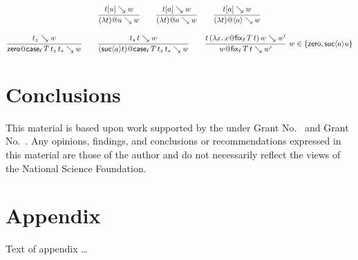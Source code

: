 \documentclass[acmlarge,review,anonymous]{acmart}\settopmatter{printfolios=true}
\begin{document}

\begin{gather*}
  \ru{t[u] \evalsto w
    }{(\lambda t) @ u \evalsto w}
\qquad
  \ru{t[a] \evalsto w
    }{(\lambda t) @ a \evalsto w}
\qquad
  \ru{t[a] \evalsto w
    }{(\lambda t) @ \ann a \evalsto w}
\\[2ex]
  \ru{t_z \evalsto w
    }{\tzero @ \casett \evalsto w}
\qquad
  \ru{t_s\, t \evalsto w
    }{(\suc a t) @ \casett \evalsto w}
\qquad
  \rux{t\,(\lambda x.\, x@ \fixtt)\,w \evalsto w'
     }{w @ \fixtt \evalsto w'
     }{w \in \{ \tzero, \suc a u \}}
\end{gather*}





\newpage

\section{Conclusions}
\label{sec:concl}

\begin{acks}                            %
  This material is based upon work supported by the
   under Grant
  No.~ and Grant
  No.~.  Any opinions, findings, and
  conclusions or recommendations expressed in this material are those
  of the author and do not necessarily reflect the views of the
  National Science Foundation.
\end{acks}





\appendix
\section{Appendix}

Text of appendix \ldots
\end{document}
